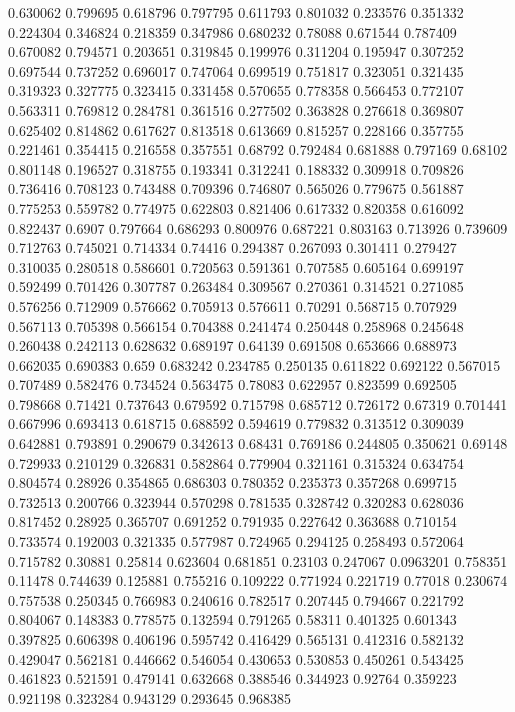 0.630062 0.799695
0.618796 0.797795
0.611793 0.801032
0.233576 0.351332
0.224304 0.346824
0.218359 0.347986
0.680232 0.78088
0.671544 0.787409
0.670082 0.794571
0.203651 0.319845
0.199976 0.311204
0.195947 0.307252
0.697544 0.737252
0.696017 0.747064
0.699519 0.751817
0.323051 0.321435
0.319323 0.327775
0.323415 0.331458
0.570655 0.778358
0.566453 0.772107
0.563311 0.769812
0.284781 0.361516
0.277502 0.363828
0.276618 0.369807
0.625402 0.814862
0.617627 0.813518
0.613669 0.815257
0.228166 0.357755
0.221461 0.354415
0.216558 0.357551
0.68792 0.792484
0.681888 0.797169
0.68102 0.801148
0.196527 0.318755
0.193341 0.312241
0.188332 0.309918
0.709826 0.736416
0.708123 0.743488
0.709396 0.746807
0.565026 0.779675
0.561887 0.775253
0.559782 0.774975
0.622803 0.821406
0.617332 0.820358
0.616092 0.822437
0.6907 0.797664
0.686293 0.800976
0.687221 0.803163
0.713926 0.739609
0.712763 0.745021
0.714334 0.74416
0.294387 0.267093
0.301411 0.279427
0.310035 0.280518
0.586601 0.720563
0.591361 0.707585
0.605164 0.699197
0.592499 0.701426
0.307787 0.263484
0.309567 0.270361
0.314521 0.271085
0.576256 0.712909
0.576662 0.705913
0.576611 0.70291
0.568715 0.707929
0.567113 0.705398
0.566154 0.704388
0.241474 0.250448
0.258968 0.245648
0.260438 0.242113
0.628632 0.689197
0.64139 0.691508
0.653666 0.688973
0.662035 0.690383
0.659 0.683242
0.234785 0.250135
0.611822 0.692122
0.567015 0.707489
0.582476 0.734524
0.563475 0.78083
0.622957 0.823599
0.692505 0.798668
0.71421 0.737643
0.679592 0.715798
0.685712 0.726172
0.67319 0.701441
0.667996 0.693413
0.618715 0.688592
0.594619 0.779832
0.313512 0.309039
0.642881 0.793891
0.290679 0.342613
0.68431 0.769186
0.244805 0.350621
0.69148 0.729933
0.210129 0.326831
0.582864 0.779904
0.321161 0.315324
0.634754 0.804574
0.28926 0.354865
0.686303 0.780352
0.235373 0.357268
0.699715 0.732513
0.200766 0.323944
0.570298 0.781535
0.328742 0.320283
0.628036 0.817452
0.28925 0.365707
0.691252 0.791935
0.227642 0.363688
0.710154 0.733574
0.192003 0.321335
0.577987 0.724965
0.294125 0.258493
0.572064 0.715782
0.30881 0.25814
0.623604 0.681851
0.23103 0.247067
0.0963201 0.758351
0.11478 0.744639
0.125881 0.755216
0.109222 0.771924
0.221719 0.77018
0.230674 0.757538
0.250345 0.766983
0.240616 0.782517
0.207445 0.794667
0.221792 0.804067
0.148383 0.778575
0.132594 0.791265
0.58311 0.401325
0.601343 0.397825
0.606398 0.406196
0.595742 0.416429
0.565131 0.412316
0.582132 0.429047
0.562181 0.446662
0.546054 0.430653
0.530853 0.450261
0.543425 0.461823
0.521591 0.479141
0.632668 0.388546
0.344923 0.92764
0.359223 0.921198
0.323284 0.943129
0.293645 0.968385
